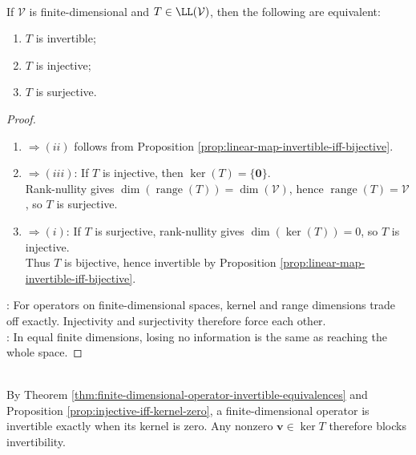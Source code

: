 \begin{theorem} \label{thm:finite-dimensional-operator-invertible-equivalences} \\
If $\mathcal{V}$ is finite-dimensional and $T \in \LL(\mathcal{V})$, then the following are equivalent:
\begin{enumerate}[label=\roman*.]
\setlength{\itemsep}{0pt}
\item $T$ is invertible;
\item $T$ is injective;
\item $T$ is surjective.
\end{enumerate}
\begin{proof}
\begin{enumerate}[label=(\roman)*.]
\setlength{\itemsep}{0pt}
\item[$(i)$] $\Rightarrow (ii)$ follows from Proposition \ref{prop:linear-map-invertible-iff-bijective}.
\item[$(ii)$] $\Rightarrow (iii)$: If $T$ is injective, then $\ker(T)=\{\mathbf{0}\}$.\\
Rank-nullity gives $\dim(\operatorname{range}(T))=\dim(\mathcal{V})$, hence $\operatorname{range}(T)=\mathcal{V}$, so $T$ is surjective.
\item[$(iii)$] $\Rightarrow (i)$: If $T$ is surjective, rank-nullity gives $\dim(\ker(T))=0$, so $T$ is injective.\\
Thus $T$ is bijective, hence invertible by Proposition \ref{prop:linear-map-invertible-iff-bijective}.
\end{enumerate}
: For operators on finite-dimensional spaces, kernel and range dimensions trade off exactly. Injectivity and surjectivity therefore force each other.\\
: In equal finite dimensions, losing no information is the same as reaching the whole space.
\end{proof}
\end{theorem}

\begin{perspective} \label{per:kernel-obstruction-to-invertibility} \\
By Theorem \ref{thm:finite-dimensional-operator-invertible-equivalences} and Proposition \ref{prop:injective-iff-kernel-zero}, a finite-dimensional operator is invertible exactly when its kernel is zero. Any nonzero $\mathbf{v}\in\ker T$ therefore blocks invertibility.
\end{perspective}

